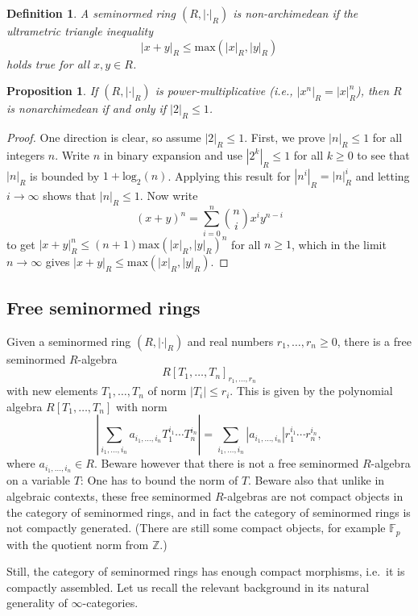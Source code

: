 \documentclass[11pt]{amsart}
\numberwithin{equation}{section}
\numberwithin{theorem}{section}
\newtheorem{proposition}[theorem]{Proposition}
\newtheorem{definition}[theorem]{Definition}
\theoremstyle{definition}
\begin{document}
\begin{definition} A seminormed ring $(R,|\cdot|_R)$ is non-archimedean if the ultrametric triangle inequality
\[
|x+y|_R\leq \mathrm{max}(|x|_R,|y|_R)
\]
holds true for all $x,y\in R$.
\end{definition}

\begin{proposition} If $(R,|\cdot|_R)$ is power-multiplicative (i.e., $|x^n|_R=|x|^n_R$), then $R$ is nonarchimedean if and only if $|2|_R\leq 1$.
\end{proposition}

\begin{proof} One direction is clear, so assume $|2|_R\leq 1$. First, we prove $|n|_R\leq 1$ for all integers $n$. Write $n$ in binary expansion and use $|2^k|_R\leq 1$ for all $k\geq 0$ to see that $|n|_R$ is bounded by $1+\mathrm{log}_2(n)$. Applying this result for $|n^i|_R= |n|_R^i$ and letting $i\to \infty$ shows that $|n|_R\leq 1$. Now write
\[
(x+y)^n = \sum_{i=0}^n \binom{n}{i} x^i y^{n-i}
\]
to get $|x+y|_R^n\leq (n+1)\mathrm{max}(|x|_R,|y|_R)^n$ for all $n\geq 1$, which in the limit $n\to \infty$ gives $|x+y|_R\leq \mathrm{max}(|x|_R,|y|_R)$.
\end{proof}

\subsection{Free seminormed rings} Given a seminormed ring $(R,|\cdot|_R)$ and real numbers $r_1,\ldots,r_n\geq 0$, there is a free seminormed $R$-algebra
\[
R[T_1,\ldots,T_n]_{r_1,\ldots,r_n}
\]
with new elements $T_1,\ldots,T_n$ of norm $|T_i|\leq r_i$. This is given by the polynomial algebra $R[T_1,\ldots,T_n]$ with norm
\[
|\sum_{i_1,\ldots,i_n} a_{i_1,\ldots,i_n} T_1^{i_1}\cdots T_n^{i_n}| = \sum_{i_1,\ldots,i_n} |a_{i_1,\ldots,i_n}| r_1^{i_1}\cdots r_n^{i_n},
\]
where $a_{i_1,\ldots,i_n}\in R$. Beware however that there is not a free seminormed $R$-algebra on a variable $T$: One has to bound the norm of $T$. Beware also that unlike in algebraic contexts, these free seminormed $R$-algebras are not compact objects in the category of seminormed rings, and in fact the category of seminormed rings is not compactly generated. (There are still some compact objects, for example $\mathbb F_p$ with the quotient norm from $\mathbb Z$.)

Still, the category of seminormed rings has enough compact morphisms, i.e.~it is compactly assembled. Let us recall the relevant background in its natural generality of $\infty$-categories.
\end{document}
